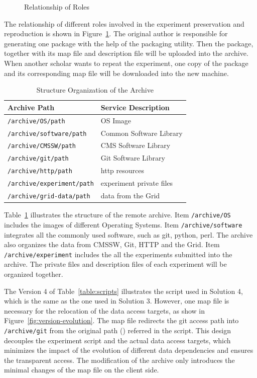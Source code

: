 \documentclass{acm_proc_article-sp}
\begin{document}
\begin{figure}
\centering
{}
\caption{Relationship of Roles}
\label{fig:solution3}
\end{figure}

The relationship of different roles involved in the experiment preservation and
reproduction is shown in Figure~\ref{fig:solution3}.  The original author is
responsible for generating one package with the help of the packaging utility. Then the package, together with
its map file and description file will be uploaded into the archive. When
another scholar wants to repeat the experiment, one copy of the package and its
corresponding map file will be downloaded into the new machine.

\begin{table}
    \centering
    \begin{tabular}{|l|l|}
        \hline
        Archive Path & Service Description \\ \hline
        {\tt /archive/OS/path} & OS Image \\ \hline
        {\tt /archive/software/path} & Common Software Library \\ \hline
        {\tt /archive/CMSSW/path} & CMS Software Library \\ \hline
        {\tt /archive/git/path} & Git Software Library \\ \hline
        {\tt /archive/http/path} & http resources \\ \hline
        {\tt /archive/experiment/path} & experiment private files \\ \hline
        {\tt /archive/grid-data/path} & data from the Grid \\ \hline
    \end{tabular}
    \caption{Structure Organization of the Archive}
    \label{table:archive-map}
\end{table}

Table~\ref{table:archive-map} illustrates the structure of the remote archive.
Item {\tt /archive/OS} includes the images of different Operating Systems.
Item {\tt /archive/software} integrates all the commonly used software, such as git,
python, perl. The archive also organizes the data from CMSSW, Git, HTTP and the
Grid. Item {\tt /archive/experiment} includes the all the experiments submitted into the
archive. The private files and description files of each experiment will be
organized together.

The Version 4 of Table~\ref{table:scripts} illustrates the script used in
Solution 4, which is the same as the one used in Solution 3. 
However, one map file is necessary for the relocation of the data access targets, as
show in Figure~\ref{fig:version-evolution}. 
The map file redirects the git access path into {\tt /archive/git} from the original path () referred in the script.
This design decouples the experiment script and the actual data access targets, which minimizes the impact of the evolution of different data dependencies
and ensures the transparent access.
The modification of the archive only introduces the minimal changes of the map file on the client side.
\end{document}
